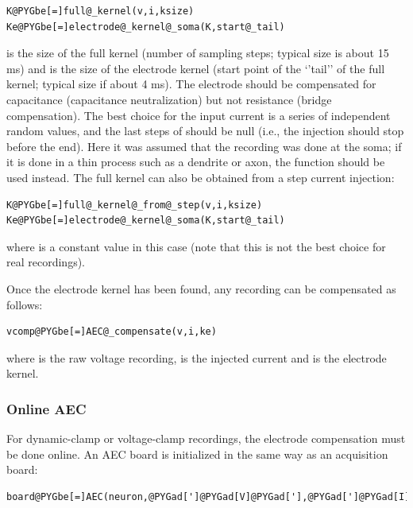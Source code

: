 \documentclass[letterpaper,10pt,english]{manual}
\begin{document}
\begin{Verbatim}[commandchars=@\[\]]
K@PYGbe[=]full@_kernel(v,i,ksize)
Ke@PYGbe[=]electrode@_kernel@_soma(K,start@_tail)
\end{Verbatim}

 is the size of the full kernel (number of sampling steps; typical size is
about 15 ms) and  is the size of the electrode kernel (start point
of the `'tail'' of the full kernel; typical size if about 4 ms). The electrode
should be compensated for capacitance (capacitance neutralization)
but not resistance (bridge compensation). The best choice for the
input current is a series of independent random values, and the last 
steps of  should be null (i.e., the injection should stop before the end).
Here it was assumed that the recording was done at the soma; if it is done in a thin
process such as a dendrite or axon, the function 
should be used instead. The full kernel can also be obtained from a step current
injection:

\begin{Verbatim}[commandchars=@\[\]]
K@PYGbe[=]full@_kernel@_from@_step(v,i,ksize)
Ke@PYGbe[=]electrode@_kernel@_soma(K,start@_tail)
\end{Verbatim}

where  is a constant value in this case (note that this is not the best choice for
real recordings).

Once the electrode kernel has been found, any recording can be compensated as follows:

\begin{Verbatim}[commandchars=@\[\]]
vcomp@PYGbe[=]AEC@_compensate(v,i,ke)
\end{Verbatim}

where  is the raw voltage recording,  is the injected current
and  is the electrode kernel.


\subsubsection{Online AEC}

For dynamic-clamp or voltage-clamp recordings, the electrode compensation must be
done online. An AEC board is initialized in the same way as an acquisition board:

\begin{Verbatim}[commandchars=@\[\]]
board@PYGbe[=]AEC(neuron,@PYGad[']@PYGad[V]@PYGad['],@PYGad[']@PYGad[I]@PYGad['],clock)
\end{Verbatim}
\end{document}
